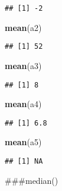 \documentclass[
]{article}
\newenvironment{Shaded}{\begin{snugshade}}{\end{snugshade}}
\newcommand{\FunctionTok}[1]{\textcolor[rgb]{0.13,0.29,0.53}{\textbf{#1}}}
\newcommand{\NormalTok}[1]{#1}
\begin{document}
\begin{verbatim}
## [1] -2
\end{verbatim}

\begin{Shaded}
\begin{Highlighting}[]
\FunctionTok{mean}\NormalTok{(a2)}
\end{Highlighting}
\end{Shaded}

\begin{verbatim}
## [1] 52
\end{verbatim}

\begin{Shaded}
\begin{Highlighting}[]
\FunctionTok{mean}\NormalTok{(a3)}
\end{Highlighting}
\end{Shaded}

\begin{verbatim}
## [1] 8
\end{verbatim}

\begin{Shaded}
\begin{Highlighting}[]
\FunctionTok{mean}\NormalTok{(a4)}
\end{Highlighting}
\end{Shaded}

\begin{verbatim}
## [1] 6.8
\end{verbatim}

\begin{Shaded}
\begin{Highlighting}[]
\FunctionTok{mean}\NormalTok{(a5)}
\end{Highlighting}
\end{Shaded}

\begin{verbatim}
## [1] NA
\end{verbatim}

\#\#\#median()
\end{document}
